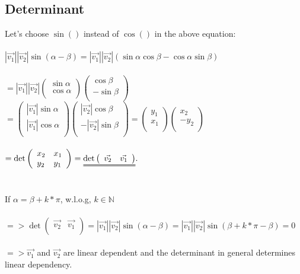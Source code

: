 \documentclass[a4paper]{article}
\newcommand*{\vecdd}[2]{\begin{pmatrix}#1\\#2\\\end{pmatrix}}
\begin{document}
\subsection*{Determinant}
Let's choose $\sin()$ instead of $\cos()$ in the above equation:
\\\\
$|\vec{v_1}||\vec{v_2}|\sin(\alpha-\beta)=|\vec{v_1}||\vec{v_2}|(\sin\alpha\cos\beta-\cos\alpha\sin\beta)$
\\\\
$=|\vec{v_1}||\vec{v_2}|\vecdd{\sin\alpha}{\cos\alpha}\vecdd{\cos\beta}{-\sin\beta}$
$=\vecdd{|\vec{v_1}|\sin\alpha}{|\vec{v_1}|\cos\alpha}\vecdd{|\vec{v_2}|\cos\beta}{-|\vec{v_2}|\sin\beta}=\vecdd{y_1}{x_1}\vecdd{x_2}{-y_2}$
\\\\
$=\det\left(\begin{array}{ll}x_2&x_1\\y_2&y_1\\\end{array}\right)=\uuline{\det\left(\begin{array}{ll}\vec{v_2}&\vec{v_1}\\\end{array}\right)}.$
\\\\\\
If $\alpha=\beta+k*\pi$, w.l.o.g, $k\in\mathbb{N}$
\\\\
$=> \det\left(\begin{array}{ll}\vec{v_2}&\vec{v_1}\\\end{array}\right)=|\vec{v_1}||\vec{v_2}|\sin(\alpha-\beta)=|\vec{v_1}||\vec{v_2}|\sin(\beta+k*\pi-\beta)=0$
\\\\
$=> \vec{v_1}$ and $\vec{v_2}$ are linear dependent and the determinant in general determines linear dependency.
\newpage
\end{document}
